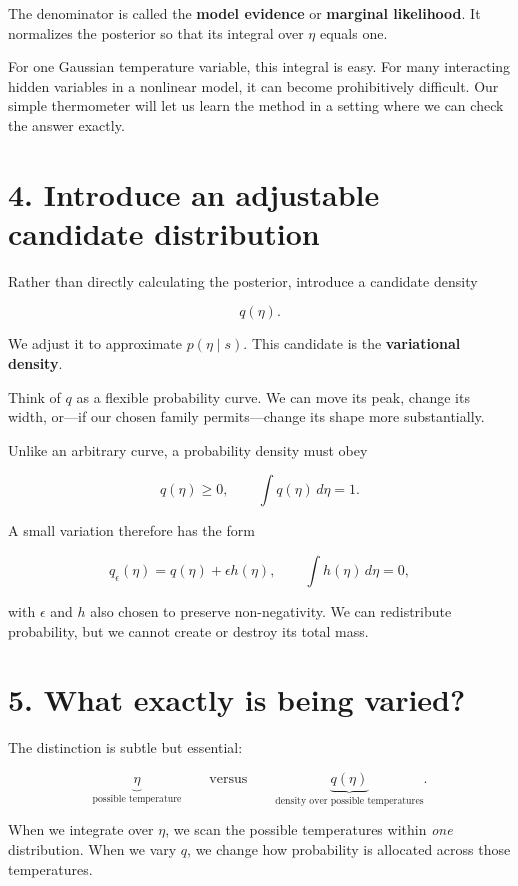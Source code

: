 \documentclass[
  letterpaper,
  DIV=11,
  numbers=noendperiod]{scrreprt}
\begin{document}
The denominator is called the \textbf{model evidence} or
\textbf{marginal likelihood}. It normalizes the posterior so that its
integral over \(\eta\) equals one.

For one Gaussian temperature variable, this integral is easy. For many
interacting hidden variables in a nonlinear model, it can become
prohibitively difficult. Our simple thermometer will let us learn the
method in a setting where we can check the answer exactly.

\section{4. Introduce an adjustable candidate
distribution}\label{introduce-an-adjustable-candidate-distribution}

Rather than directly calculating the posterior, introduce a candidate
density

\[
q(\eta).
\]

We adjust it to approximate \(p(\eta\mid s)\). This candidate is the
\textbf{variational density}.

Think of \(q\) as a flexible probability curve. We can move its peak,
change its width, or---if our chosen family permits---change its shape
more substantially.

Unlike an arbitrary curve, a probability density must obey

\[
q(\eta)\geq 0,
\qquad
\int q(\eta)\,d\eta=1.
\]

A small variation therefore has the form

\[
q_\epsilon(\eta)=q(\eta)+\epsilon h(\eta),
\qquad \int h(\eta)\,d\eta=0,
\]

with \(\epsilon\) and \(h\) also chosen to preserve non-negativity. We
can redistribute probability, but we cannot create or destroy its total
mass.

\section{5. What exactly is being
varied?}\label{what-exactly-is-being-varied}

The distinction is subtle but essential:

\[
\underbrace{\eta}_{\text{possible temperature}}
\qquad\text{versus}\qquad
\underbrace{q(\eta)}_{\text{density over possible temperatures}}.
\]

When we integrate over \(\eta\), we scan the possible temperatures
within \emph{one} distribution. When we vary \(q\), we change how
probability is allocated across those temperatures.
\end{document}
